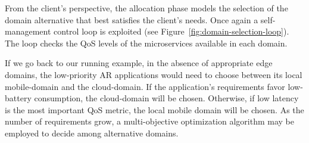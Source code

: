 From the client's perspective, the allocation phase models the selection of the domain alternative that best satisfies the client's needs. Once again a self-management control loop is exploited (see Figure~\ref{fig:domain-selection-loop}). The loop checks the QoS levels of the microservices available in each domain.





If we go back to our running example, in the absence of appropriate edge domains, the low-priority AR applications would need to choose between its local mobile-domain and the cloud-domain. If the application's requirements favor low-battery consumption, the cloud-domain will be chosen. Otherwise, if low latency is the most important QoS metric, the local mobile domain will be chosen. As the number of requirements grow, a multi-objective optimization algorithm may be employed to decide among alternative domains.







